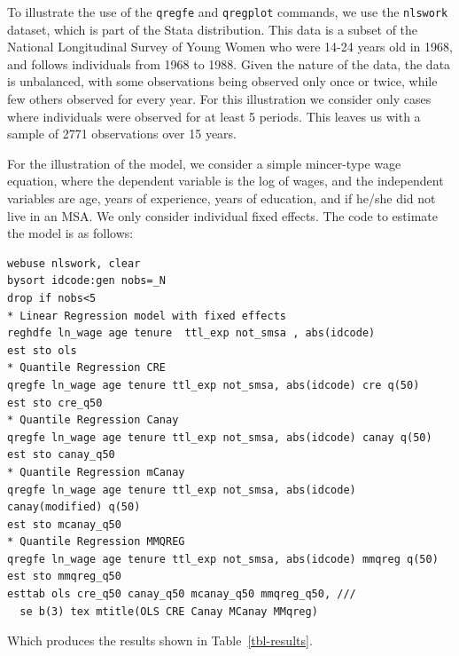 \documentclass[bib]{statapress}
\begin{document}
To illustrate the use of the \texttt{qregfe} and \texttt{qregplot}
commands, we use the \texttt{nlswork} dataset, which is part of the
Stata distribution. This data is a subset of the National Longitudinal
Survey of Young Women who were 14-24 years old in 1968, and follows
individuals from 1968 to 1988. Given the nature of the data, the data is
unbalanced, with some observations being observed only once or twice,
while few others observed for every year. For this illustration we
consider only cases where individuals were observed for at least 5
periods. This leaves us with a sample of 2771 observations over 15
years.

For the illustration of the model, we consider a simple mincer-type wage
equation, where the dependent variable is the log of wages, and the
independent variables are age, years of experience, years of education,
and if he/she did not live in an MSA. We only consider individual fixed
effects. The code to estimate the model is as follows:

\begin{verbatim}
webuse nlswork, clear
bysort idcode:gen nobs=_N
drop if nobs<5
* Linear Regression model with fixed effects
reghdfe ln_wage age tenure  ttl_exp not_smsa , abs(idcode)
est sto ols
* Quantile Regression CRE
qregfe ln_wage age tenure ttl_exp not_smsa, abs(idcode) cre q(50) 
est sto cre_q50
* Quantile Regression Canay
qregfe ln_wage age tenure ttl_exp not_smsa, abs(idcode) canay q(50) 
est sto canay_q50
* Quantile Regression mCanay
qregfe ln_wage age tenure ttl_exp not_smsa, abs(idcode) canay(modified) q(50) 
est sto mcanay_q50
* Quantile Regression MMQREG
qregfe ln_wage age tenure ttl_exp not_smsa, abs(idcode) mmqreg q(50) 
est sto mmqreg_q50
esttab ols cre_q50 canay_q50 mcanay_q50 mmqreg_q50, ///
  se b(3) tex mtitle(OLS CRE Canay MCanay MMqreg)
\end{verbatim}

Which produces the results shown in Table~\ref{tbl-results}.
\end{document}
